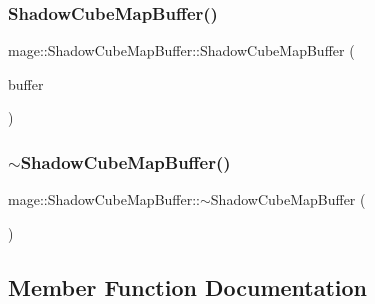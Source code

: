 \hypertarget{structmage_1_1_shadow_cube_map_buffer_af2e79caa3f372f164dc59982e3a94ff2}{}\label{structmage_1_1_shadow_cube_map_buffer_af2e79caa3f372f164dc59982e3a94ff2} 
\subsubsection{\texorpdfstring{Shadow\+Cube\+Map\+Buffer()}{ShadowCubeMapBuffer()}\hspace{0.1cm}{\footnotesize\ttfamily [4/4]}}
{\footnotesize\ttfamily mage\+::\+Shadow\+Cube\+Map\+Buffer\+::\+Shadow\+Cube\+Map\+Buffer (\begin{DoxyParamCaption}\item[{\hyperlink{structmage_1_1_shadow_cube_map_buffer}{Shadow\+Cube\+Map\+Buffer} \&\&}]{buffer }\end{DoxyParamCaption})\hspace{0.3cm}{\ttfamily [default]}}

\hypertarget{structmage_1_1_shadow_cube_map_buffer_ad84dab42c8391819f93f9e60acd4655d}{}\label{structmage_1_1_shadow_cube_map_buffer_ad84dab42c8391819f93f9e60acd4655d} 
\subsubsection{\texorpdfstring{$\sim$\+Shadow\+Cube\+Map\+Buffer()}{~ShadowCubeMapBuffer()}}
{\footnotesize\ttfamily mage\+::\+Shadow\+Cube\+Map\+Buffer\+::$\sim$\+Shadow\+Cube\+Map\+Buffer (\begin{DoxyParamCaption}{ }\end{DoxyParamCaption})\hspace{0.3cm}{\ttfamily [default]}}



\subsection{Member Function Documentation}
\hypertarget{structmage_1_1_shadow_cube_map_buffer_a67365d28537a2eda63d37b8cc5f2f0bd}{}\label{structmage_1_1_shadow_cube_map_buffer_a67365d28537a2eda63d37b8cc5f2f0bd} 
